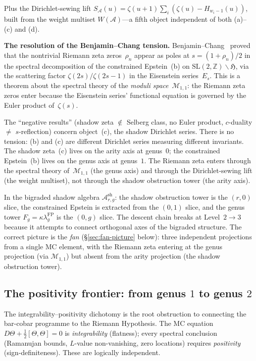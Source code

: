 \documentclass[11pt]{article}
\newcommand{\cA}{\mathcal{A}}
\newcommand{\cM}{\mathcal{M}}
\newcommand{\Z}{\mathbb{Z}}
\begin{document}
\noindent Plus the Dirichlet-sewing lift
$S_\cA(u) = \zeta(u{+}1)\sum_i (\zeta(u) - H_{w_i - 1}(u))$,
built from the weight multiset $W(\cA)$---a fifth object
independent of both (a)--(c) and (d).

\textbf{The resolution of the Benjamin--Chang tension.}
Benjamin--Chang~\cite{BenjaminChang22} proved that the
nontrivial Riemann zeta zeros~$\rho_n$ appear as poles at
$s = (1 + \rho_n)/2$ in the spectral decomposition of the
constrained Epstein~(b) on $\mathrm{SL}(2,\Z)\backslash
\mathfrak{H}$, via the scattering factor
$\zeta(2s)/\zeta(2s{-}1)$ in the Eisenstein series~$E_s$.
This is a theorem about the spectral theory of the
\emph{moduli space}~$\cM_{1,1}$: the Riemann zeta zeros enter
because the Eisenstein series' functional equation is governed
by the Euler product of~$\zeta(s)$.

The ``negative results'' (shadow zeta $\notin$ Selberg class,
no Euler product, $c$-duality $\neq$ $s$-reflection)
concern object~(c), the shadow Dirichlet series.  There is no
tension: (b) and (c) are different Dirichlet series measuring
different invariants.  The shadow zeta~(c) lives on the arity axis
at genus~$0$; the constrained Epstein~(b) lives on the genus
axis at genus~$1$.  The Riemann zeta enters through the spectral
theory of~$\cM_{1,1}$ (the genus axis) and through the
Dirichlet-sewing lift (the weight multiset), not through the
shadow obstruction tower (the arity axis).

In the bigraded shadow algebra $\cA^{\mathrm{sh}}_{r,g}$:
the shadow obstruction tower is the $(r, 0)$ slice, the
constrained Epstein is extracted from the $(0, 1)$ slice, and
the genus tower $F_g = \kappa \lambda_g^{\mathrm{FP}}$ is the
$(0, g)$ slice.  The descent chain breaks at Level~$2 \to 3$
because it attempts to connect orthogonal axes of the bigraded
structure.  The correct picture is the \emph{fan}
(\S\ref{sec:fan-picture} below): three independent projections
from a single MC element, with the Riemann zeta entering at
the genus projection (via $\cM_{1,1}$) but absent from the
arity projection (the shadow obstruction tower).

\subsection{The positivity frontier: from genus $1$ to genus $2$}
\label{sec:positivity-frontier}

The integrability--positivity dichotomy is the root obstruction
to connecting the bar-cobar programme to the Riemann Hypothesis.
The MC equation $D\Theta + \tfrac{1}{2}[\Theta,\Theta] = 0$ is
\emph{integrability} (flatness); every spectral conclusion
(Ramanujan bounds, $L$-value non-vanishing, zero locations)
requires \emph{positivity} (sign-definiteness).  These are
logically independent.
\end{document}
